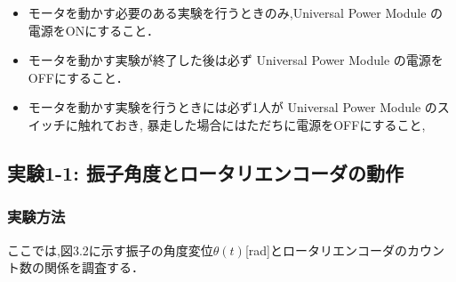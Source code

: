 \begin{itemize}
  \item モータを動かす必要のある実験を行うときのみ,Universal Power Module の電源をONにすること．
  \item モータを動かす実験が終了した後は必ず Universal Power Module の電源をOFFにすること．
  \item モータを動かす実験を行うときには必ず1人が Universal Power Module のスイッチに触れておき, 暴走した場合にはただちに電源をOFFにすること,
\end{itemize}

\subsection{実験1-1: 振子角度とロータリエンコーダの動作}

\subsubsection{実験方法}
\noindent
ここでは,図3.2に示す振子の角度変位\(\theta (t)\)[rad]とロータリエンコーダのカウント数の関係を調査する．


